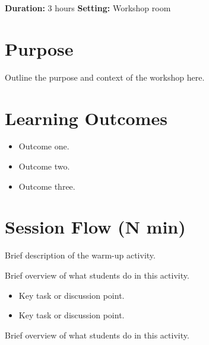 \documentclass[11pt,a4paper]{article}
\begin{document}
\maketitle
\vspace{-0.75em}
\noindent\textbf{Duration:} 3 hours \hfill \textbf{Setting:} Workshop room

\section*{Purpose}

Outline the purpose and context of the workshop here.

\section*{Learning Outcomes}
\begin{itemize}
  \item Outcome one.
  \item Outcome two.
  \item Outcome three.
\end{itemize}

\section*{Session Flow (N min)}



Brief description of the warm-up activity.


Brief overview of what students do in this activity.
\begin{itemize}
  \item Key task or discussion point.
  \item Key task or discussion point.
\end{itemize}


Brief overview of what students do in this activity.
\end{document}
